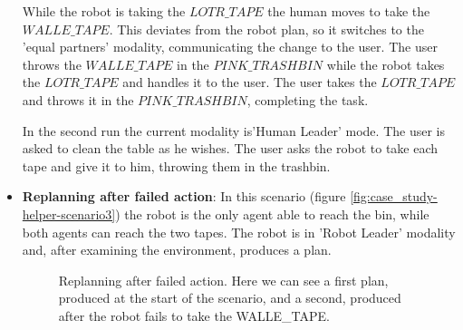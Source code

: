 \begin{itemize}
While the robot is taking the $LOTR\_TAPE$ the human moves
to take the $WALLE\_TAPE$. This deviates from the robot plan, so it
switches to the 'equal partners' modality, communicating the change to
the user. The user throws the $WALLE\_TAPE$ in the $PINK\_TRASHBIN$ while
the robot takes the $LOTR\_TAPE$ and handles it to the user. The user
takes the $LOTR\_TAPE$ and throws it in the $PINK\_TRASHBIN$, completing the task.

In the second run the current modality is'Human Leader' mode. The user is
asked to clean the table as he wishes. The user asks the robot to take
each tape and give it to him, throwing them in the trashbin.

\item
\textbf{Replanning after failed action}: 
In this scenario (figure \ref{fig:case_study-helper-scenario3}) the robot is the only agent able to reach the
bin, while both agents can reach the two tapes. The
robot is in 'Robot Leader' modality and, after examining the
environment, produces a plan.

\begin{figure}
  \caption{Replanning after failed action. Here we can see a first
    plan, produced at the start of the scenario, and a second,
    produced after the robot fails to take the WALLE\_TAPE. }
  \centering
\end{figure}
\end{itemize}
